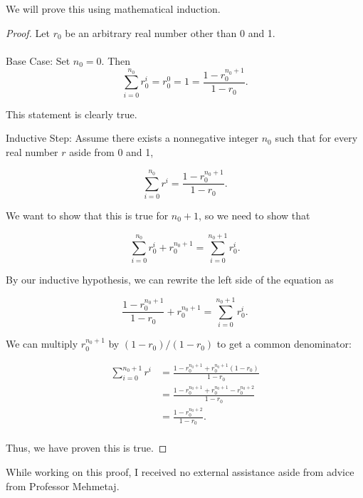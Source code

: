 \documentclass[12pt]{article}
\begin{document}
\noindent We will prove this using mathematical induction.

\begin{proof} Let $r_0$ be an arbitrary real number other than 0 and 1. \\ \\

    \noindent Base Case: Set $n_0 = 0.$ Then $$\sum_{i=0}^{n_0} r_0^i = r_0^0 = 1 = \frac{1 - r_0^{n_0+1}}{1 - r_0}.$$

    This statement is clearly true.

    \noindent Inductive Step: Assume there exists a nonnegative integer $n_0$ such that for every real number $r$ aside from 0 and 1,

    $$\sum_{i=0}^{n_0} r^i = \frac{1 - r_0^{n_0+1}}{1 - r_0}.$$

    We want to show that this is true for $n_0+1$, so we need to show that

    $$\sum_{i=0}^{n_0} r_0^i + r_0^{n_0+1} = \sum_{i=0}^{n_0 + 1} r_0^i.$$

    By our inductive hypothesis, we can rewrite the left side of the equation as

    $$\frac{1 - r_0^{n_0+1}}{1 - r_0} + r_0^{n_0+1} = \sum_{i=0}^{n_0 + 1} r_0^i.$$

    We can multiply $r_0^{n_0+1}$ by $(1-r_0)/(1-r_0)$ to get a common denominator:

    \begin{align*}
        \sum_{i=0}^{n_0 + 1} r^i & = \frac{1 - r_0^{n_0+1} + r_0^{n_0+1}(1-r_0)}{1 - r_0} \\
        & = \frac{1 - r_0^{n_0+1} + r_0^{n_0+1} - r_0^{n_0+2}}{1 - r_0} \\
        & = \frac{1 - r_0^{n_0+2}}{1 - r_0}. \\
    \end{align*}

    Thus, we have proven this is true.

\end{proof}


\noindent While working on this proof, I received no external assistance aside from advice from Professor Mehmetaj.
\end{document}
